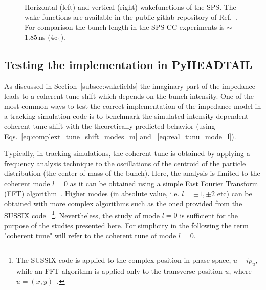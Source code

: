 \begin{figure}[!ht]
\begin{subfigure}[t]{0.45\textwidth}
    \end{subfigure}
    \hfill
     \caption{Horizontal (left) and vertical (right) wakefunctions of the SPS. The wake functions are available in the public gitlab repository of Ref.~\cite{sps_impedance_model_git}. For comparison the bunch length in the SPS CC experiments is $\sim$ 1.85\,ns (4$\mathrm{\sigma_t}$).} %
     \label{fig:sps_wakefunctions_model_H_V}
 \end{figure}




\subsection{Testing the implementation in PyHEADTAIL}\label{subsec:test_implementation_pyheatail}
As discussed in Section~\ref{subsec:wakefields} the imaginary part of the impedance leads to a coherent tune shift which depends on the bunch intensity. One of the most common ways to test the correct implementation of the impedance model in a tracking simulation code is to benchmark the simulated intensity-dependent coherent tune shift with the theoretically predicted behavior (using Eqs.~\eqref{eq:complext_tune_shift_modes_m} and ~\eqref{eq:real_tunu_mode_l}).

Typically, in tracking simulations, the coherent tune is obtained by applying a frequency analysis technique to the oscillations of the centroid of the particle distribution (the center of mass of the bunch). Here, the analysis is limited to the coherent mode $l=0$ as it can be obtained using a simple Fast Fourier Transform (FFT) algorithm~\cite{FFT_and_applications}. Higher modes (in absolute value, i.e. $l=\pm 1, \pm 2$ etc) can be obtained with more complex algorithms such as the oned provided from the SUSSIX code~\cite{Bartolini:702438} \footnote{The SUSSIX code is applied to the complex position in phase space, $u-i p_u$, while an FFT algorithm is applied only to the transverse position $u$, where $u=(x,y)$~\cite{Salvant:1274254}.}. Nevertheless, the study of mode $l=0$ is sufficient for the purpose of the studies presented here. For simplicity in the following the term "coherent tune" will refer to the coherent tune of mode $l=0$.

